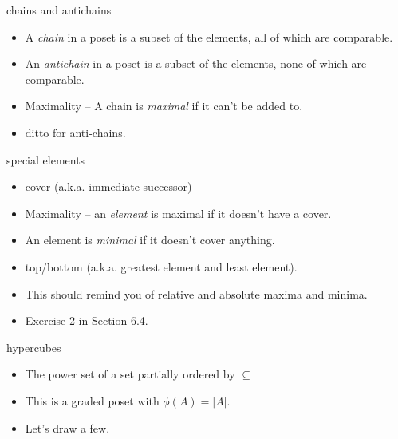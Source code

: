 \documentclass[handout,landscape]{beamer}
\begin{document}
\begin{frame}{chains and antichains}
\begin{itemize}
\item A \emph{chain} in a poset is a subset of the elements, all 
of which are comparable. \pause
\item An {\em antichain} in a poset is a subset
of the elements, none of which are comparable.\pause
\item Maximality -- A chain is {\em maximal} if it can't be added to. \pause
\item ditto for anti-chains.
\end{itemize}
\end{frame}

\begin{frame}{special elements}
\begin{itemize}
\item cover \pause (a.k.a. immediate successor) \pause
\item Maximality -- an {\em element} is maximal if it doesn't have a cover.\pause
\item An element is {\em minimal} if it doesn't cover anything.\pause
\item top/bottom \pause (a.k.a. greatest element and least element). \pause
\item This should remind you of relative and absolute maxima and minima. \pause
\item Exercise 2 in Section 6.4.
\end{itemize}
\end{frame}

\begin{frame}{hypercubes}
\begin{itemize}
\item The power set of a set partially ordered by $\subseteq$ \pause
\item This is a graded poset with $\phi(A) = |A|$.
\item Let's draw a few.
\end{itemize}
\end{frame}
\end{document}
